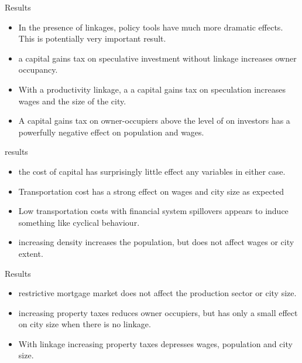 \documentclass[notes=show]{beamer} %
\begin{document}
\begin{frame}{Results}
\begin{itemize}

 \item In the presence of linkages, policy tools have much more dramatic effects. This is potentially very important result. 
 \pause

 \item  a capital gains tax on speculative investment without linkage increases owner occupancy. 

 \item With a productivity linkage, a a capital gains tax on speculation increases wages and the size of the city. 
 \pause
  \item  A capital gains tax on owner-occupiers above the level of on investors has a powerfully negative effect on population and wages.
\end{itemize}
\end{frame}%
\begin{frame}{results}
\begin {itemize}


 \item  the cost of capital has surprisingly little effect any variables in  either case.

 \item  Transportation cost has a strong effect on wages and city size as expected 
 
  \item Low transportation costs with financial system spillovers appears to induce something like cyclical behaviour.

 \item  increasing density increases the population, but does not affect wages or city extent.
\end{itemize}
\end{frame}%
\begin{frame}{Results}
\begin {itemize}
 \item restrictive mortgage market does not affect the production sector or city size.

 \item  increasing property taxes reduces owner occupiers, but has only a small effect on city size when there is no linkage. 
 
 \item  With linkage increasing property taxes depresses wages, population and city size.
\end{itemize}
\end{frame}%
\end{document}

